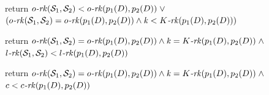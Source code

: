 \begin{function}[!t]
\SetNoFillComment
return
   $o\emph{-}\mathit{rk}(\mathcal{S}_1,\mathcal{S}_2)<o\emph{-}\mathit{rk}(p_1(D),
   p_2(D))\;\vee$\\
   $(o\emph{-}\mathit{rk}(\mathcal{S}_1,\mathcal{S}_2)=o\emph{-}\mathit{rk}(p_1(D),
   p_2(D))\wedge
   \mathit{k}<K\emph{-}\mathit{rk}(p_1(D),p_2(D)))$\;
	\caption{better-ok(set $\mathcal{S}_1$, set
           $\mathcal{S}_2$, division $D$, int $k$)}
	\label{better-ok}
\end{function}
\begin{function}[!t]
\SetNoFillComment
return
     $o\emph{-}\mathit{rk}(\mathcal{S}_1,\mathcal{S}_2)=o\emph{-}\mathit{rk}(p_1(D),
     p_2(D))\wedge
\mathit{k}=K\emph{-}\mathit{rk}(p_1(D),p_2(D))\;\wedge$\\
    $l\emph{-}\mathit{rk}(\mathcal{S}_1,\mathcal{S}_2)<l\emph{-}\mathit{rk}(p_1(D), p_2(D))$\;	\caption{better-l(set $\mathcal{S}_1$, set
           $\mathcal{S}_2$, division $D$, int $k$)}
	\label{better-l}
\end{function}
\begin{function}[!t]
\SetNoFillComment
return
     $o\emph{-}\mathit{rk}(\mathcal{S}_1,\mathcal{S}_2)=o\emph{-}\mathit{rk}(p_1(D),
     p_2(D))\wedge
\mathit{k}=K\emph{-}\mathit{rk}(p_1(D),p_2(D))\;\wedge$\\
    $c<c\emph{-}\mathit{rk}(p_1(D),
     p_2(D))$\;
     \caption{better-c(set $\mathcal{S}_1$, set $\mathcal{S}_2$,
     division $D$, int $k$, int $c$)}
	\label{better-c}
\end{function}
